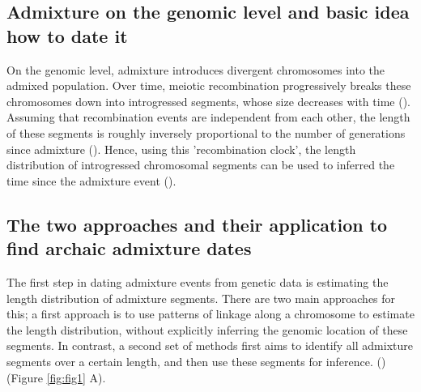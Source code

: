 \documentclass[]{article}
\begin{document}
\subsection{Admixture on the genomic level and basic idea how to date
it}\label{admixture-on-the-genomic-level-and-basic-idea-how-to-date-it}

On the genomic level, admixture introduces  divergent chromosomes
into the admixed population. Over time, meiotic recombination
progressively breaks these chromosomes down into introgressed segments, whose size decreases with time (\cite{falush_inference_2003}). 
Assuming that recombination events are
independent from each other, the length of these segments  is roughly inversely proportional to  the number of
generations since admixture
(\cite{moorjani_history_2011,pool_inference_2009,gravel_population_2012,liang_lengths_2014}).
Hence, using this 'recombination clock', the length distribution of introgressed chromosomal segments
 can be used to inferred the time since the
admixture event 
(\cite{moorjani_history_2011,pugach_dating_2011,sankararaman_date_2012,loh_inferring_2013,sankararaman_combined_2016,pugach_gateway_2018,jacobs_multiple_2019,hellenthal_genetic_2014}).


\subsection{The two approaches and their application to find archaic admixture dates}\label{the-two-approaches-and-their-application-to-find-archaic-admixture-dates}

The first step in dating admixture events from genetic data is estimating the length distribution of admixture segments.  There are two main approaches for this; a first approach is to use patterns of linkage along a chromosome to estimate the length distribution, without explicitly inferring the genomic location of these segments. In contrast, a second set of methods first aims to identify all admixture segments over a certain length, and then use these segments for inference. 
(\cite{chimusa_dating_2018}) (Figure \ref{fig:fig1} A).
\end{document}
